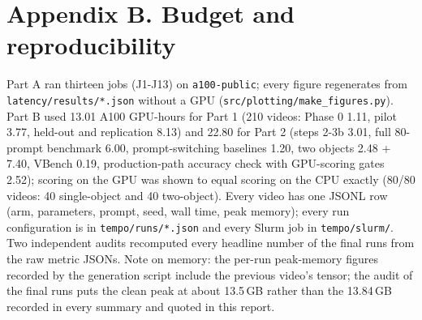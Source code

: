 \documentclass[10pt,a4paper]{article}
\begin{document}
\section*{Appendix B. Budget and reproducibility}
\small
Part A ran thirteen jobs (J1-J13) on \texttt{a100-public}; every figure regenerates from \texttt{latency/results/*.json} without a GPU (\texttt{src/plotting/make\_figures.py}). Part B used 13.01 A100 GPU-hours for Part 1 (210 videos: Phase 0 1.11, pilot 3.77, held-out and replication 8.13) and 22.80 for Part 2 (steps 2-3b 3.01, full 80-prompt benchmark 6.00, prompt-switching baselines 1.20, two objects 2.48 + 7.40, VBench 0.19, production-path accuracy check with GPU-scoring gates 2.52); scoring on the GPU was shown to equal scoring on the CPU exactly (80/80 videos: 40 single-object and 40 two-object). Every video has one JSONL row (arm, parameters, prompt, seed, wall time, peak memory); every run configuration is in \texttt{tempo/runs/*.json} and every Slurm job in \texttt{tempo/slurm/}. Two independent audits recomputed every headline number of the final runs from the raw metric JSONs. Note on memory: the per-run peak-memory figures recorded by the generation script include the previous video's tensor; the audit of the final runs puts the clean peak at about 13.5\,GB rather than the 13.84\,GB recorded in every summary and quoted in this report.
\end{document}
